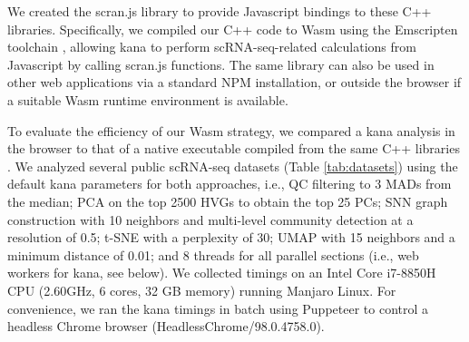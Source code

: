 \documentclass{article}
\begin{document}
We created the scran.js library \cite{scran.js} to provide Javascript bindings to these C++ libraries.
Specifically, we compiled our C++ code to Wasm using the Emscripten toolchain \cite{zakai2011emscripten},
allowing kana to perform scRNA-seq-related calculations from Javascript by calling scran.js functions.
The same library can also be used in other web applications via a standard NPM installation, 
or outside the browser if a suitable Wasm runtime environment is available.

To evaluate the efficiency of our Wasm strategy, 
we compared a kana analysis in the browser to that of a native executable compiled from the same C++ libraries \cite{scrancli}.
We analyzed several public scRNA-seq datasets (Table \ref{tab:datasets}) using the default kana parameters for both approaches, i.e.,
QC filtering to 3 MADs from the median;
PCA on the top 2500 HVGs to obtain the top 25 PCs;
SNN graph construction with 10 neighbors and multi-level community detection at a resolution of 0.5;
t-SNE with a perplexity of 30;
UMAP with 15 neighbors and a minimum distance of 0.01;
and 8 threads for all parallel sections (i.e., web workers for kana, see below).
We collected timings on an Intel Core i7-8850H CPU (2.60GHz, 6 cores, 32 GB memory) running Manjaro Linux.
For convenience, we ran the kana timings in batch using Puppeteer \cite{puppeteer} to control a headless Chrome browser (HeadlessChrome/98.0.4758.0). 

\begin{table}
\caption{Collection of scRNA-seq datasets used for testing.}
\label{tab:datasets}
\begin{center}
\end{center}
\end{table}
\end{document}
